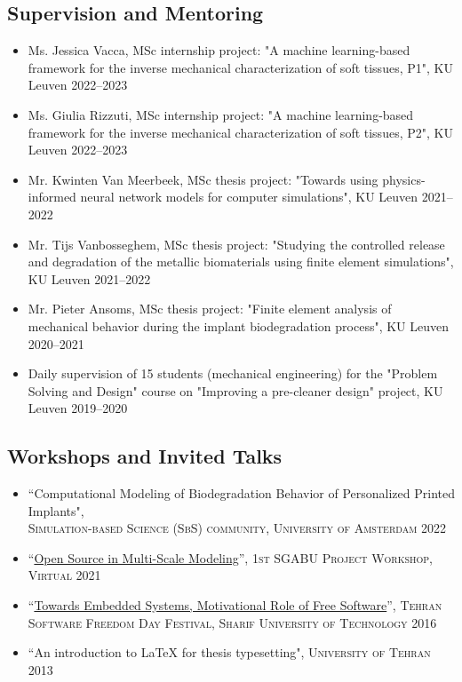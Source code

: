 \documentclass{cv}
\begin{document}
\subsection{Supervision and Mentoring}

\begin{itemize}[itemsep=-0.2ex]
\item
Ms. Jessica Vacca, MSc internship project: "A machine learning-based framework for the inverse mechanical characterization of soft tissues, P1", KU Leuven \hfill 2022--2023
\item
Ms. Giulia Rizzuti, MSc internship project: "A machine learning-based framework for the inverse mechanical characterization of soft tissues, P2", KU Leuven \hfill 2022--2023
\item 
Mr. Kwinten Van Meerbeek, MSc thesis project: "Towards using physics-informed neural network models for computer simulations", KU Leuven \hfill 2021--2022
\item 
Mr. Tijs Vanbosseghem, MSc thesis project: "Studying the controlled release and
degradation of the metallic biomaterials using finite element simulations", KU Leuven \hfill 2021--2022
\item 
Mr. Pieter Ansoms, MSc thesis project: "Finite element analysis of mechanical behavior during the implant biodegradation process", KU Leuven \hfill 2020--2021
\item
Daily supervision of 15 students (mechanical engineering) for the "Problem Solving and Design" course on "Improving a pre-cleaner design" project, KU Leuven \hfill 2019--2020
\end{itemize}

\subsection{Workshops and Invited Talks}

\begin{itemize}[itemsep=-0.2ex]
\item
``Computational Modeling of Biodegradation Behavior of Personalized Printed Implants",\\ \textsc{Simulation-based Science (SbS) community, University of Amsterdam} \hfill 2022
\item
``\href{https://www.youtube.com/watch?v=3nIExqK49n4}{Open Source in Multi-Scale Modeling}'', \textsc{1st SGABU Project Workshop, Virtual} \hfill 2021
\item
``\href{https://www.slideshare.net/tehsfd/embedded-system-70659214}{Towards Embedded Systems, Motivational Role of Free Software}'', \textsc{Tehran Software Freedom Day Festival, Sharif University of Technology} \hfill 2016
\item
``An introduction to \LaTeX{} for thesis typesetting", \textsc{University of Tehran} \hfill 2013
\end{itemize}
\end{document}
